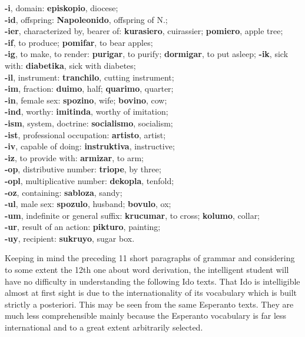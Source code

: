 \textbf{-i}, domain: \textbf{episkopio}, diocese; \\ 
\textbf{-id}, offspring: \textbf{Napoleonido}, offspring of N.; \\ 
\textbf{-ier}, characterized by, bearer of: \textbf{kurasiero}, cuirassier; \textbf{pomiero}, apple tree; \\ 
\textbf{-if}, to produce; \textbf{pomifar}, to bear apples; \\ 
\textbf{-ig}, to make, to render: \textbf{purigar}, to purify; \textbf{dormigar}, to put asleep;
\textbf{-ik}, sick with: \textbf{diabetika}, sick with diabetes; \\ 
\textbf{-il}, instrument: \textbf{tranchilo}, cutting instrument; \\ 
\textbf{-im}, fraction: \textbf{duimo}, half; \textbf{quarimo}, quarter; \\ 
\textbf{-in}, female sex: \textbf{spozino}, wife; \textbf{bovino}, cow; \\ 
\textbf{-ind}, worthy: \textbf{imitinda}, worthy of imitation; \\ 
\textbf{-ism}, system, doctrine: \textbf{socialismo}, socialism; \\ 
\textbf{-ist}, professional occupation: \textbf{artisto}, artist; \\ 
\textbf{-iv}, capable of doing: \textbf{instruktiva}, instructive; \\ 
\textbf{-iz}, to provide with: \textbf{armizar}, to arm; \\ 
\textbf{-op}, distributive number: \textbf{triope}, by three; \\ 
\textbf{-opl}, multiplicative number: \textbf{dekopla}, tenfold; \\ 
\textbf{-oz}, containing: \textbf{sabloza}, sandy; \\ 
\textbf{-ul}, male sex: \textbf{spozulo}, husband; \textbf{bovulo}, ox; \\ 
\textbf{-um}, indefinite or general suffix: \textbf{krucumar}, to cross; \textbf{kolumo}, collar; \\ 
\textbf{-ur}, result of an action: \textbf{pikturo}, painting; \\ 
\textbf{-uy}, recipient: \textbf{sukruyo}, sugar box. 

Keeping in mind the preceding 11 short paragraphs of grammar and considering to some extent the 12th one about word derivation, the intelligent student will have no difficulty in understanding the following Ido texts. That Ido is intelligible almost at first sight is due to the internationality of its vocabulary which is built strictly a posteriori. This may be seen from the same Esperanto texts. They are much less comprehensible mainly because the Esperanto vocabulary is far less international and to a great extent arbitrarily selected. 

